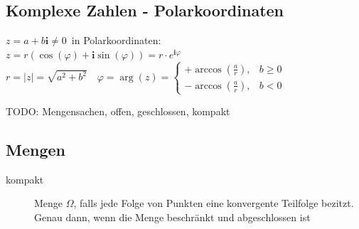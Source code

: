 \subsection{Komplexe Zahlen - Polarkoordinaten}
$z=a+b\mathbf{i}\ne0$\ in Polarkoordinaten:\\
$z=r (\cos(\varphi)+\mathbf{i}\sin(\varphi))=r\cdot e^{\mathbf{i} \varphi}$\\
$r=|z|=\sqrt{a^2+b^2}\quad\varphi=\arg(z)=\begin{cases}+\arccos \left( \frac{a}{r}\right),  & b\ge0   \\  -\arccos \left( \frac{a}{r}\right), & b<0\end{cases}$

TODO: Mengensachen, offen, geschlossen, kompakt


\subsection{Mengen}
\begin{description}
	\item[kompakt] Menge $\Omega$, falls jede Folge von Punkten eine konvergente Teilfolge bezitzt. Genau dann, wenn die Menge beschränkt und abgeschlossen ist
\end{description}